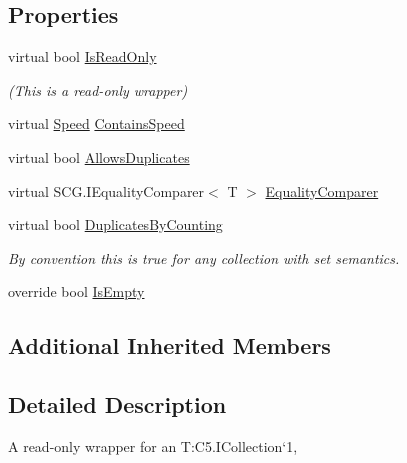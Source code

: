 \subsection*{Properties}
\begin{DoxyCompactItemize}
\item 
virtual bool \hyperlink{class_c5_1_1_guarded_collection_ae7060bcf53641981bda57c113cd2e017}{Is\+Read\+Only}
\begin{DoxyCompactList}\small\item\em (This is a read-\/only wrapper) \end{DoxyCompactList}\item 
virtual \hyperlink{namespace_c5_a615ba88dcdaa8d5a3c5f833a73d7fad6}{Speed} \hyperlink{class_c5_1_1_guarded_collection_a4c6ae95c3e5066e8f657546606deefaf}{Contains\+Speed}
\item 
virtual bool \hyperlink{class_c5_1_1_guarded_collection_ac879f9062572ce67048d438409b1f8a9}{Allows\+Duplicates}
\item 
virtual S\+C\+G.\+I\+Equality\+Comparer$<$ T $>$ \hyperlink{class_c5_1_1_guarded_collection_a71c7b8ae4fa03c0100428c7bd76db71e}{Equality\+Comparer}
\item 
virtual bool \hyperlink{class_c5_1_1_guarded_collection_a02b79c68161065d8e2c6ddc89f004aea}{Duplicates\+By\+Counting}
\begin{DoxyCompactList}\small\item\em By convention this is true for any collection with set semantics. \end{DoxyCompactList}\item 
override bool \hyperlink{class_c5_1_1_guarded_collection_a9a2e5fbcc49ab5a00eb4d2b929a03761}{Is\+Empty}
\end{DoxyCompactItemize}
\subsection*{Additional Inherited Members}


\subsection{Detailed Description}
A read-\/only wrapper for an T\+:\+C5.\+I\+Collection`1, 

